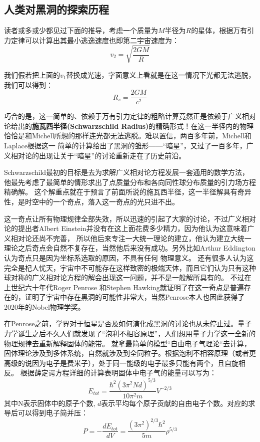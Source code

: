 \documentclass{ctexart}
\begin{document}
    \subsection{人类对黑洞的探索历程}

    读者或多或少都见过下面的推导，考虑一个质量为$M$半径为$R$的星体，根据万有引力定律可以计算出其最小逃逸速度也即第二宇宙速度为：
    \begin{equation}
        v_2=\sqrt{\frac{2GM}{R}}
    \end{equation}
    
    我们假若把上面的$v_1$替换成光速，字面意义上看就是在这一情况下光都无法逃脱，我们可以得到：
    \begin{equation}
        R_s=\frac{2GM}{c^2}
    \end{equation}
    
    巧合的是，这一简单的、依赖于万有引力定律的粗略计算竟然正是依赖于广义相对论给出的\textbf{施瓦西半径(Schwarzschild Radius)}的精确形式！在这一半径内的物理
    恰恰是和Michell所想的那样连光都无法逃脱。难以置信，两百多年前，Michell和Laplace根据这一 简单的计算给出了黑洞的雏形——“暗星”，又过了一百多年，广义相对论的出现让关于“暗星”的讨论重新走在了历史前沿。
    
    Schwarzschild最初的目标是去为求解广义相对论方程发展一套通用的数学方法，他最先考虑了最简单的情形求出了点质量分布和各向同性球分布质量的引力场方程精确解。\cite{Schwarzschild.K}
    这个解重点就在于预言了前面所说的施瓦西半径，这一半径解具有奇异性，是时空中的一个奇点，落入这一奇点的光只进不出。

    这一奇点让所有物理规律全部失效，所以迅速的引起了大家的讨论，不过广义相对论的提出者Albert Einstein并没有在这上面花费多少精力，因为他认为这意味着广义相对论还尚不完善，
    所以他后来专注一大统一理论的建立，他认为建立大统一理论之后奇点会自然不复存在，当然他后来没有成功。另外比如Arthur Eddington 认为奇点只是因为坐标系选取的原因，不具有任何
    物理意义。\cite{EA} 还有很多人认为这完全是杞人忧天，宇宙中不可能存在这样致密的极端天体，而且它们认为只有这种球对称的广义相对论方程的解会出现这一问题，并不是一般解所具有的。
    不过在上世纪六十年代Roger Penrose 和Stephen Hawking就证明了在这一奇点是普遍存在的\cite{RP}，证明了宇宙中存在黑洞的可能性非常大，当然Penrose本人也因此获得了2020年的Nobel物理学奖。

    在Penrose之前，学界对于恒星是否及如何演化成黑洞的讨论也从未停止过。量子力学诞生之后不久人们就发现了“泡利不相容原理”，人们想用量子力学这一全新的物理规律去重新解释固体的能带。
    就拿最简单的模型“自由电子气理论“去计算，固体理论涉及到多体系统，自然就涉及到全同粒子。根据泡利不相容原理（或者更高级的说因为电子是费米子），处于同一能级的电子最多只能有两个，且自旋相反。
    根据薛定谔方程详细的计算表明固体中电子气的能量可以写为：
    \begin{equation}
        E_{tot}=\frac{\hbar^2\left(3\pi^2N d\right)^{5/3}}{10\pi^2 m}V^{-2/3}
    \end{equation}
    其中N表示固体中的原子个数, $d$表示平均每个原子贡献的自由电子个数。对应的求导后可以得到电子简并压：
    \begin{equation}
        P=-\frac{d E_{tot}}{dV}=\frac{\left(3\pi^2\right)^{2/3}\hbar^2}{5m}\rho^{5/3}
    \end{equation}
    
\end{document}
